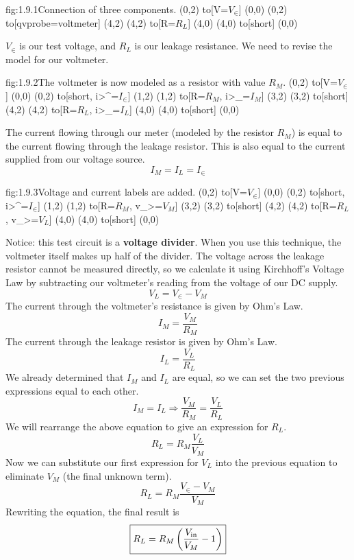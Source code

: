 \begin{circuit}{fig:1.9.1}{Connection of three components.}
    (0,2) to[V=$V_{\in}$] (0,0)
    (0,2) to[qvprobe=voltmeter] (4,2)
    (4,2) to[R=$R_L$] (4,0)
    (4,0) to[short] (0,0)
\end{circuit}

$V_{\in}$ is our test voltage, and $R_L$ is our leakage resistance. We need to revise the model for our voltmeter.

\begin{circuit}{fig:1.9.2}{The voltmeter is now modeled as a resistor with value $R_M$.}
    (0,2) to[V=$V_{\in}$] (0,0)
    (0,2) to[short, i>^=$I_{\in}$] (1,2)
    (1,2) to[R=$R_M$, i>_=$I_M$] (3,2)
    (3,2) to[short] (4,2)
    (4,2) to[R=$R_L$, i>_=$I_L$] (4,0)
    (4,0) to[short] (0,0)
\end{circuit}

The current flowing through our meter (modeled by the resistor $R_M$) is equal to the current flowing through the leakage resistor. This is also equal to the current supplied from our voltage source.
\[I_M = I_L = I_{\in}\]

\begin{circuit}{fig:1.9.3}{Voltage and current labels are added.}
    (0,2) to[V=$V_{\in}$] (0,0)
    (0,2) to[short, i>^=$I_{\in}$] (1,2)
    (1,2) to[R=$R_M$, v_>=$V_M$] (3,2)
    (3,2) to[short] (4,2)
    (4,2) to[R=$R_L$, v_>=$V_L$] (4,0)
    (4,0) to[short] (0,0)
\end{circuit}

Notice: this test circuit is a \textbf{voltage divider}.  When you use this technique, the voltmeter itself makes up half of the divider. The voltage across the leakage resistor cannot be measured directly, so we calculate it using Kirchhoff's Voltage Law by subtracting our voltmeter's reading from the voltage of our DC supply.
\[V_L = V_{\in} - V_M\]
The current through the voltmeter's resistance is given by Ohm's Law.
\[I_M = \frac{V_M}{R_M}\]
The current through the leakage resistor is given by Ohm's Law.
\[I_L = \frac{V_L}{R_L}\]
We already determined that $I_M$ and $I_L$ are equal, so we can set the two previous expressions equal to each other.
\[I_M = I_L  \Rightarrow  \frac{V_M}{R_M} = \frac{V_L}{R_L}\]
We will rearrange the above equation to give an expression for $R_L$.
\[R_L = R_M \frac{V_L}{V_M}\]
Now we can substitute our first expression for $V_L$ into the previous equation to eliminate $V_M$ (the final unknown term).
\[R_L = R_M \frac{V_{\in} - V_M}{V_M}\]
Rewriting the equation, the final result is
\[\boxed{R_L = R_M \left(\frac{V_{\text{in}}}{V_M} - 1\right)}\]

